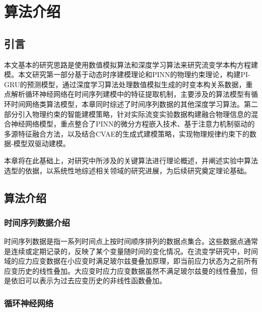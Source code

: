 \chapter{算法介绍}
\section{引言}
本文基本的研究思路是使用数值模拟算法和深度学习算法来研究流变学本构方程建模。本文研究第一部分基于动态时序建模理论和PINN的物理约束理论，构建PI-GRU的预测模型，通过深度学习算法处理数值模拟生成的时变本构关系数据，重点解析循环神经网络在时间序列建模中的特征提取机制，主要涉及的算法模型有循环时间网络类算法模型，本章同时综述了时间序列数据的其他深度学习算法。第二部分引入物理约束的智能建模策略，针对实际流变实验数据构建融合物理信息的混合神经网络模型，重点整合了PINN的微分方程嵌入技术、基于注意力机制驱动的多源特征融合方法，以及结合CVAE的生成式建模策略，实现物理规律约束下的数据-模型双驱动建模。

本章将在此基础上，对研究中所涉及的关键算法进行理论概述，并阐述实验中算法选型的依据，以系统性地综述相关领域的研究进展，为后续研究奠定理论基础。
\section{算法介绍}
\subsection{时间序列数据介绍}
时间序列数据是指一系列时间点上按时间顺序排列的数据点集合。这些数据点通常是连续或定期记录的，反映了某个变量随时间的变化情况。在流变学研究中，时间域的应力应变数据在小应变时满足玻尔兹曼叠加原理，即当前应力状态为之前所有应变历史的线性叠加\cite{boltzmannZurTheorieElastischen1878}。大应变时应力应变数据虽然不满足玻尔兹曼的线性叠加，但是依旧可以表示为过去应变历史的非线性函数叠加。

\subsection{循环神经网络}
